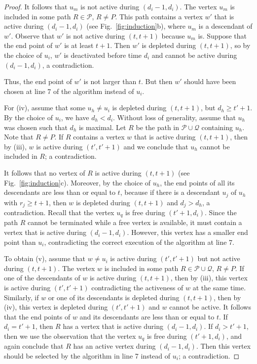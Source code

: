 \documentclass{llncs}
\newcommand{\cP}{{\mathcal P}}
\newcommand{\cQ}{{\mathcal Q}}
\begin{document}
\begin{proof}
It follows that $u_m$ is not active during $(d_i-1,d_i)$. 
The vertex $u_m$ is included in some path $R\in\cP$, $R\neq P$. This path contains a vertex $w'$ that is active 
during $(d_i-1,d_i)$ (see Fig.~\ref{fig:induction}b), where $u_m$ is a descendant of $w'$.
Observe that $w'$ is not active during $(t,t+1)$ because $u_m$ is.
Suppose that the end point of $w'$ is at least $t+1$.  Then $w'$ is depleted during $(t,t+1)$, so by the choice of $u_i$, $w'$ is deactivated before time $d_i$ and cannot be active during $(d_i-1,d_i)$, a contradiction.

Thus, the end point of $w'$ is not larger than $t$.  But then $w'$
should have been chosen at line 7 of the algorithm instead of $u_i$.

For (iv), assume that some $u_h\ne u_i$ is depleted during $(t,t+1)$, but $d_h\geq t'+1$. 
By the choice of $u_i$, we have $d_h<d_i$. 
Without loss of generality, assume that $u_h$ was chosen such that $d_h$ is maximal.
Let $R$ be the path in $\cP\cup\cQ$ containing $u_h$. Note that $R\neq
P$. If $R$ contains a vertex $w$ that is active during $(t,t+1)$, then by (iii),
$w$ is active during $(t',t'+1)$ and we conclude that $u_h$ cannot be included in $R$; a contradiction.

It follows that no vertex of $R$ is active during $(t,t+1)$ (see Fig.~\ref{fig:induction}c).
Moreover, by the choice of $u_h$, the end points of all its descendants are less than or equal to $t$, because if there is a descendant $u_j$ of $u_h$ with $r_j \geq t+1$, then $w$ is depleted during $(t,t+1)$ and $d_j > d_h$, a contradiction.   
Recall that the vertex $u_q$ is free during $(t'+1,d_i)$. Since the path $R$ cannot be terminated while a free vertex is available, it must contain a vertex that is active during $(d_i-1,d_i)$. However, this vertex has a smaller end point than $u_i$, contradicting the correct execution of the algorithm at line 7.

To obtain (v), assume that $w\neq u_i$ is active during $(t',t'+1)$ but not active during $(t,t+1)$. The vertex $w$ is included in some path $R\in\cP\cup\cQ$, $R\neq P$. 
If  one of the descendants of $w$ is active during $(t,t+1)$, then by (iii), this vertex is active during $(t',t'+1)$ contradicting the activeness of $w$ at the same time.
Similarly, if $w$ or one of its descendants is depleted during $(t,t+1)$, then by (iv), this vertex is depleted during $(t',t'+1)$ and $w$ cannot be active.
It follows that the end points of $w$ and its descendants are less than or equal to $t$. If $d_i=t'+1$, then $R$ has a vertex that is active during  $(d_i-1,d_i)$.
If $d_i>t'+1$, then we use the observation that the vertex $u_q$ is free during $(t'+1,d_i)$, and again conclude that
 $R$ has an active vertex during  $(d_i-1,d_i)$. Then this vertex should be selected by the algorithm in line 7 instead of $u_i$; a contradiction.


\end{proof}
\end{document}
